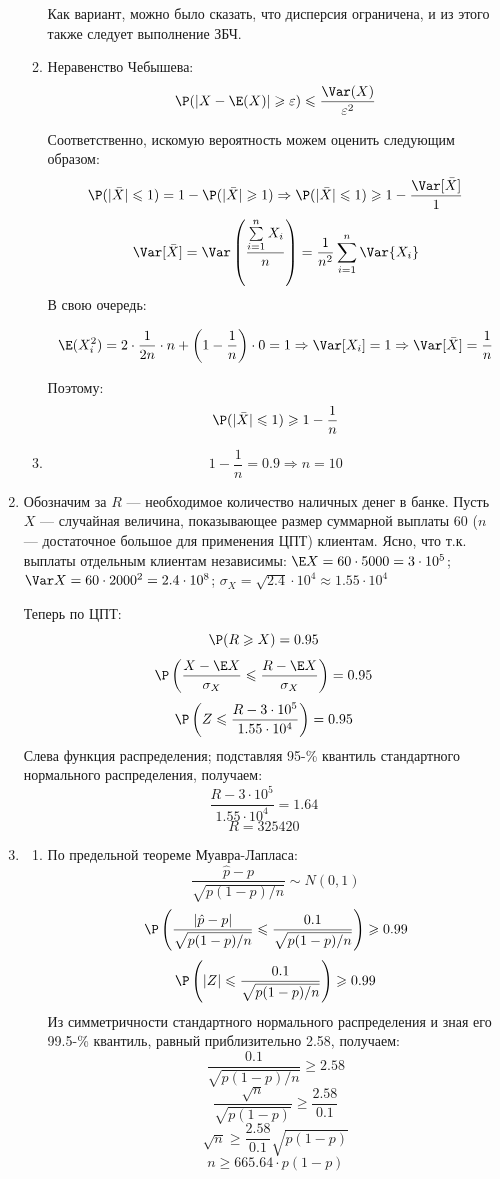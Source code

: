 \begin{enumerate}
\begin{enumerate}
Как вариант, можно было сказать, что дисперсия ограничена, и из этого также следует выполнение ЗБЧ.
\item Неравенство Чебышева:
\[
\P(|X-\E(X)|\geqslant \varepsilon) \leqslant \frac{\Var(X)}{\varepsilon^2}
\]

Соответственно, искомую вероятность можем оценить следующим образом:
\[
\P(|\bar{X}| \leqslant 1) = 1 -\P(|\bar{X}| \geqslant 1) \Rightarrow \P(|\bar{X}| \leqslant 1) \geqslant 1 - \frac{\Var[\bar{X}]}{1}
\]
\[
\Var[\bar{X}] = \Var\left(\frac{\sum\limits_{i=1}^{n} X_i}{n}\right) = \frac{1}{n^2}\sum \limits_{i=1}^{n} \Var{X_i}
\]
В свою очередь:

\[
\E(X_i^2) = 2\cdot\frac{1}{2n}\cdot n + \left(1-\frac{1}{n}\right)\cdot0 = 1 \Rightarrow \Var[X_i] = 1 \Rightarrow \Var[\bar{X}] = \frac{1}{n}
\]

Поэтому:
\[
\P(|\bar{X}| \leqslant 1)\geqslant 1 - \frac{1}{n}
\]

\item  \[1 - \frac{1}{n} = 0.9  \Rightarrow n = 10\]

\end{enumerate}

\item

Обозначим за $R$ — необходимое количество наличных денег в банке. Пусть $X$ — случайная величина, показывающее размер суммарной выплаты $60$ ($n$ — достаточное большое для применения ЦПТ) клиентам. Ясно, что т.к. выплаты отдельным клиентам независимы: \( \E X = 60 \cdot 5000 = 3\cdot 10^5 \); \( \Var X = 60 \cdot 2000^2 = 2.4 \cdot 10^8 \); \( \sigma_X = \sqrt{2.4} \cdot 10^4 \approx 1.55 \cdot 10^4\)

Теперь по ЦПТ:
\[\P(R \geqslant X) = 0.95 \]
\[\P \left(\frac{X - \E X}{\sigma_X} \leqslant \frac{R - \E X}{\sigma_X} \right) = 0.95 \]
\[ \P \left( Z \leqslant \frac{R - 3 \cdot 10^5}{1.55 \cdot 10^4} \right) = 0.95 \]
Слева функция распределения; подставляя 95-\% квантиль стандартного нормального распределения, получаем:
\[ \frac{R - 3 \cdot 10^5}{1.55 \cdot 10^4} = 1.64 \]
\[ R = 325420 \]


\item

\begin{enumerate}
\item По предельной теореме Муавра-Лапласа:
\[ \frac{\hat{p} - p}{\sqrt{p(1-p)/n}} \sim N (0,1) \]
\[ \P \left( \frac{|\hat{p} - p|}{\sqrt{p(1-p)/n}} \leqslant \frac{0.1}{\sqrt{p(1-p)/n}} \right) \geqslant 0.99 \]
\[ \P \left( |Z| \leqslant \frac{0.1}{\sqrt{p(1-p)/n}} \right) \geqslant 0.99 \]
Из симметричности стандартного нормального распределения и зная его 99.5-\% квантиль, равный приблизительно 2.58, получаем:
\[ \frac{0.1}{\sqrt{p(1-p)/n}} \geqslant 2.58 \]
\[ \frac{\sqrt{n}}{\sqrt{p(1-p)}} \geqslant \frac{2.58}{0.1} \]
\[ \sqrt{n} \geqslant \frac{2.58}{0.1} \sqrt{p(1-p)} \]
\[ n \geqslant 665.64 \cdot p(1-p) \]


\end{enumerate}
\end{enumerate}
